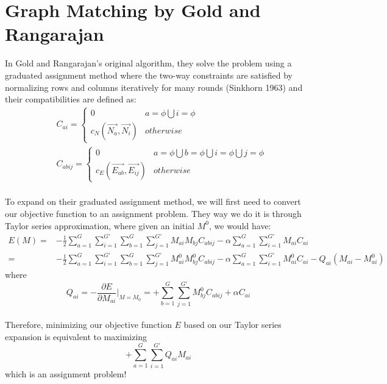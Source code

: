 \section{Graph Matching by Gold and Rangarajan}

In Gold and Rangarajan's original algorithm, they solve the problem using a graduated assignment method where the two-way constraints are satisfied by normalizing rows and columns iteratively for many rounds (Sinkhorn 1963) and their compatibilities are defined as:
\begin{align} 
& C_{ai}  = \begin{cases}0 & a=\phi \bigcup i=\phi \\c_N(\overrightarrow{N_{a}},\overrightarrow{N_{i}}) & otherwise\end{cases}\\
& C_{abij} = \begin{cases}0 & a=\phi \bigcup b=\phi \bigcup i=\phi \bigcup j=\phi \\c_E(\overrightarrow{E_{ab}},\overrightarrow{E_{ij}}) & otherwise\end{cases} 
\end{align}\\

To expand on their graduated assignment method, we will first need to convert our objective function to an assignment problem. They way we do it is through Taylor series approximation, where given an initial $M^0$, we would have:
\begin{align}
E(M) = & -\frac{1}{2}\sum_{a=1}^{G}\sum_{i=1}^{G'}\sum_{b=1}^{G}\sum_{j=1}^{G'}M_{ai}M_{bj}C_{abij}-\alpha\sum_{a=1}^{G}\sum_{i=1}^{G'}M_{ai}C_{ai}\nonumber\\
= & -\frac{1}{2}\sum_{a=1}^{G}\sum_{i=1}^{G'}\sum_{b=1}^{G}\sum_{j=1}^{G'}M_{ai}^{0}M_{bj}^{0}C_{abij}-\alpha\sum_{a=1}^{G}\sum_{i=1}^{G'}M_{ai}^{0}C_{ai} - Q_{ai}(M_{ai}-M_{ai}^{0})
\end{align}
where
\begin{equation} 
Q_{ai}=-\frac{\partial E}{\partial M_{ai}}\bigg\rvert_{M=M_0}=+\sum_{b=1}^{G}\sum_{j=1}^{G'}M_{bj}^{0}C_{abij}+\alpha C_{ai}
\end{equation}\\

Therefore, minimizing our objective function $E$ based on our Taylor series expansion is equivalent to maximizing 
\begin{equation}
+\sum_{a=1}^{G}\sum_{i=1}^{G'}Q_{ai}M_{ai}
\end{equation}
which is an assignment problem!\\

